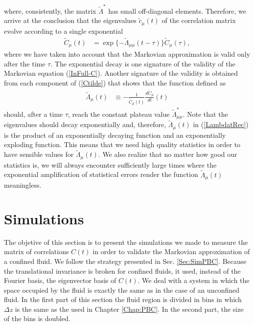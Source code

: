 \documentclass[b5paper,openright,10pt]{book}
\begin{document}
where,   consistently,  the   matrix  $\tilde{\Lambda}^*$   has  small
off-diagonal elements.   Therefore, we  arrive at the  conclusion that
the eigenvalues  $\tilde{c}_\mu(t)$ of  the correlation  matrix evolve
according to a single exponential
\begin{align}
  \tilde{C}_\mu(t)&=\exp\{-\tilde{\Lambda}_{\mu\mu} (t-\tau)\}  \tilde{C}_\mu(\tau),
\end{align}
where we have  taken into account that the  Markovian approximation is
valid  only  after the  time  $\tau$.  The  exponential decay  is  one
signature    of   the    validity    of    the   Markovian    equation
(\ref{InFull-C}). Another  signature of the validity  is obtained from
each component of (\ref{Ctilde}) that  shows that the function defined
as
\begin{align}
  \tilde{\Lambda}_{\mu}(t)&\equiv -\frac{1}{{\tilde{C}}_{\mu}(t)}\frac{d{\tilde{C}}_{\mu}}{dt}(t)
\label{LambdatRec}
\end{align}
should,  after  a time  $\tau$,  reach  the  constant plateau  value  $
\tilde{\Lambda}_{\mu\mu}^*$.  Note  that the eigenvalues  should decay
exponentially  and,  therefore,  $  \tilde{\Lambda}_{\mu}(t)$ in (\ref{LambdatRec}) is  the
product  of an  exponentially decaying  function and  an exponentially
exploding function. This means that we need high quality statistics in
order  to have  sensible values  for $  \tilde{\Lambda}_{\mu}(t)$.  We
also realize that no matter how good our statistics is, we will always
encounter sufficiently large times where the exponential amplification
of statistical errors render  the function $ \tilde{\Lambda}_{\mu}(t)$
meaningless.


\section{Simulations}
\label{Sec:SimWALLS}
The objetive of this section is to present the simulations we made to measure the matrix of correlations $C(t)$ in order to validate the Markovian approximation of a confined fluid. 
We follow the strategy presented in Sec. \ref{Sec:SimPBC}. Because the translational invariance is broken for confined fluids, it used, instead of the Fourier basis, the eigenvector basis of $C(t)$. 
We deal with a system in which the space occupied by the fluid is exactly the same as in the case of an unconfined fluid. In the first part of this section the fluid region is divided in bins in which $\Delta z$ is the same as the used in Chapter \ref{Chap:PBC}. In the second part, the size of the bins is doubled. 
\end{document}
